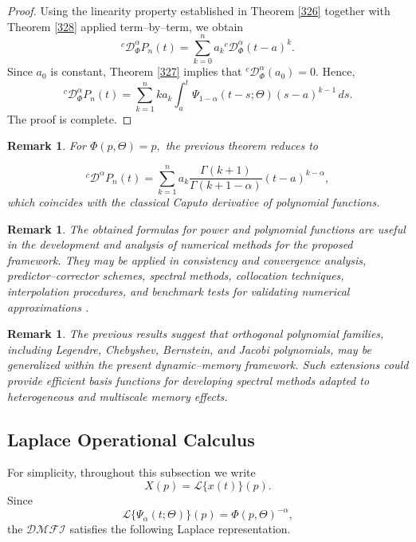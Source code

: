 \documentclass[11pt]{article}
\numberwithin{equation}{section}
\newtheorem{remark}[definition]{Remark}
\begin{document}
\begin{proof}
Using the linearity property established in Theorem \ref{326} together with Theorem \ref{328} applied term--by--term, we obtain
\[
{}^c \mathcal D_\Phi^\alpha
P_n(t)
=
\sum_{k=0}^{n}
a_k
{}^c \mathcal D_\Phi^\alpha
(t-a)^k.
\]
Since \(a_0\) is constant, Theorem \ref{327} implies that
\(
{}^c \mathcal D_\Phi^\alpha(a_0)=0.
\)
Hence,
\[
{}^c \mathcal D_\Phi^\alpha
P_n(t)
=
\sum_{k=1}^{n}
k a_k
\int_a^t
\Psi_{1-\alpha}(t-s;\Theta)
(s-a)^{k-1}
\,ds.
\]
The proof is complete.
\end{proof}

\begin{remark}For
\(
\Phi(p,\Theta)=p,
\)
the previous theorem reduces to

\[
{}^c \mathcal D^\alpha
P_n(t)
=
\sum_{k=1}^{n}
a_k
\frac{\Gamma(k+1)}
{\Gamma(k+1-\alpha)}
(t-a)^{k-\alpha},
\]
which coincides with the classical Caputo derivative of polynomial functions.
\end{remark}

\begin{remark}
The obtained formulas for power and polynomial functions are useful in the development
and analysis of numerical methods for the proposed framework. They may be applied in
consistency and convergence analysis, predictor--corrector schemes, spectral methods,
collocation techniques, interpolation procedures, and benchmark tests for validating
numerical approximations \cite{Diethelm2002,ZayernouriKarniadakis2013,LiZeng2015}.
\end{remark}

\begin{remark}
The previous results suggest that orthogonal polynomial families, including Legendre,
Chebyshev, Bernstein, and Jacobi polynomials, may be generalized within the present
dynamic--memory framework. Such extensions could provide efficient basis functions for
developing spectral methods adapted to heterogeneous and multiscale memory effects.
\end{remark}

\subsection{Laplace Operational Calculus}

For simplicity, throughout this subsection we write
\[
X(p)=\mathcal L\{x(t)\}(p).
\]
Since
\[
\mathcal L\{\Psi_\alpha(t;\Theta)\}(p)
=
\Phi(p,\Theta)^{-\alpha},
\]
the $\mathcal{DMFI}$ satisfies the following Laplace representation.
\end{document}
